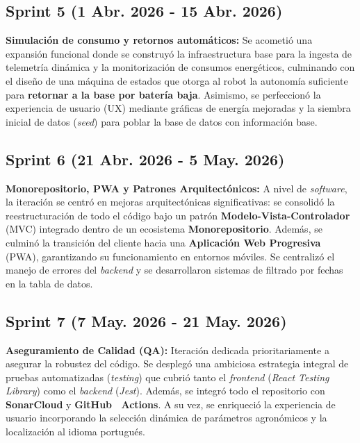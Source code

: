 \subsection{Sprint 5 (1 Abr. 2026 - 15 Abr. 2026)}
\textbf{Simulación de consumo y retornos automáticos:} Se acometió una expansión funcional donde se construyó la infraestructura base para la ingesta de telemetría dinámica y la monitorización de consumos energéticos, culminando con el diseño de una máquina de estados que otorga al robot la autonomía suficiente para \textbf{retornar a la base por batería baja}. Asimismo, se perfeccionó la experiencia de usuario (UX) mediante gráficas de energía mejoradas y la siembra inicial de datos (\textit{seed}) para poblar la base de datos con información base.

\subsection{Sprint 6 (21 Abr. 2026 - 5 May. 2026)}
\textbf{Monorepositorio, PWA y Patrones Arquitectónicos:} A nivel de \textit{software}, la iteración se centró en mejoras arquitectónicas significativas: se consolidó la reestructuración de todo el código bajo un patrón \textbf{Modelo-Vista-Controlador} (MVC) integrado dentro de un ecosistema \textbf{Monorepositorio}. Además, se culminó la transición del cliente hacia una \textbf{Aplicación Web Progresiva} (PWA), garantizando su funcionamiento en entornos móviles. Se centralizó el manejo de errores del \textit{backend} y se desarrollaron sistemas de filtrado por fechas en la tabla de datos.

\subsection{Sprint 7 (7 May. 2026 - 21 May. 2026)}
\textbf{Aseguramiento de Calidad (QA):} Iteración dedicada prioritariamente a asegurar la robustez del código. Se desplegó una ambiciosa estrategia integral de pruebas automatizadas (\textit{testing}) que cubrió tanto el \textit{frontend} (\textit{React Testing Library}) como el \textit{backend} (\textit{Jest}). Además, se integró todo el repositorio con \textbf{SonarCloud} y \textbf{GitHub~\cite{github} Actions}. A su vez, se enriqueció la experiencia de usuario incorporando la selección dinámica de parámetros agronómicos y la localización al idioma portugués.

